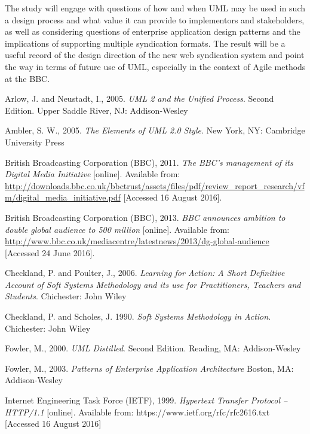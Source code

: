 \documentclass[a4paper]{article}
\begin{document}
The study will engage with questions of how and when UML may be used in such a design process and what value it can provide to implementors and stakeholders, as well as considering questions of enterprise application design patterns and the implications of supporting multiple syndication formats. The result will be a useful record of the design direction of the new web syndication system and point the way in terms of future use of UML, especially in the context of Agile methods at the BBC.

\clearpage

\begin{thebibliography}{9}

Arlow, J. and Neustadt, I., 2005.
\textit{UML 2 and the Unified Process}. Second Edition.
Upper Saddle River, NJ: Addison-Wesley

Ambler, S. W., 2005.
\textit{The Elements of UML 2.0 Style}.
New York, NY: Cambridge University Press

British Broadcasting Corporation (BBC), 2011.
\textit{The BBC's management of its Digital Media Initiative} [online].
Available from: \url{http://downloads.bbc.co.uk/bbctrust/assets/files/pdf/review_report_research/vfm/digital_media_initiative.pdf} [Accessed 16 August 2016].

British Broadcasting Corporation (BBC), 2013.
\textit{BBC announces ambition to double global audience to 500 million} [online].
Available from: \url{http://www.bbc.co.uk/mediacentre/latestnews/2013/dg-global-audience} [Accessed 24 June 2016].

Checkland, P. and Poulter, J., 2006.
\textit{Learning for Action: A Short Definitive Account of Soft Systems Methodology and its use for Practitioners, Teachers and Students}.
Chichester: John Wiley

Checkland, P. and Scholes, J. 1990.
\textit{Soft Systems Methodology in Action}.
Chichester: John Wiley

Fowler, M., 2000.
\textit{UML Distilled}. Second Edition.
Reading, MA: Addison-Wesley

Fowler, M., 2003.
\textit{Patterns of Enterprise Application Architecture}
Boston, MA: Addison-Wesley

Internet Engineering Task Force (IETF), 1999.
\textit{Hypertext Transfer Protocol -- HTTP/1.1} [online].
Available from: https://www.ietf.org/rfc/rfc2616.txt
[Accessed 16 August 2016]


\end{thebibliography}
\end{document}
